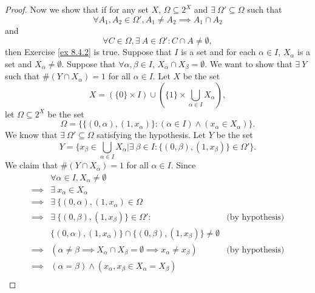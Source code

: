 \begin{proof}
    Now we show that if for any set \(X\), \(\Omega \subseteq 2^X\) and \(\exists\ \Omega' \subseteq \Omega\) such that
    \[
        \forall A_1, A_2 \in \Omega', A_1 \neq A_2 \implies A_1 \cap A_2
    \]
    and
    \[
        \forall C \in \Omega, \exists\ A \in \Omega' : C \cap A \neq \emptyset,
    \]
    then Exercise \ref{ex 8.4.2} is true.
    Suppose that \(I\) is a set and for each \(\alpha \in I\), \(X_{\alpha}\) is a set and \(X_{\alpha} \neq \emptyset\).
    Suppose that \(\forall \alpha, \beta \in I\), \(X_{\alpha} \cap X_{\beta} = \emptyset\).
    We want to show that \(\exists\ Y\) such that \(\#(Y \cap X_{\alpha}) = 1\) for all \(\alpha \in I\).
    Let \(X\) be the set
    \[
        X = (\{0\} \times I) \cup (\{1\} \times \bigcup_{\alpha \in I} X_{\alpha}),
    \]
    let \(\Omega \subseteq 2^X\) be the set
    \[
        \Omega = \big\{\{(0, \alpha), (1, x_{\alpha})\} : (\alpha \in I) \land (x_{\alpha} \in X_{\alpha})\big\}.
    \]
    We know that \(\exists\ \Omega' \subseteq \Omega\) satisfying the hypothesis.
    Let \(Y\) be the set
    \[
        Y = \big\{x_{\beta} \in \bigcup_{\alpha \in I} X_{\alpha} | \exists\ \beta \in I : \{(0, \beta), (1, x_{\beta})\} \in \Omega'\big\}.
    \]
    We claim that \(\#(Y \cap X_{\alpha}) = 1\) for all \(\alpha \in I\).
    Since
    \begin{align*}
                 & \forall \alpha \in I, X_{\alpha} \neq \emptyset                                                                                \\
        \implies & \exists\ x_{\alpha} \in X_{\alpha}                                                                                             \\
        \implies & \exists\ \{(0, \alpha), (1, x_{\alpha}) \in \Omega                                                                             \\
        \implies & \exists\ \{(0, \beta), (1, x_{\beta})\} \in \Omega' :                                                 & \text{(by hypothesis)} \\
                 & \{(0, \alpha), (1, x_{\alpha})\} \cap \{(0, \beta), (1, x_{\beta})\} \neq \emptyset                                            \\
        \implies & (\alpha \neq \beta \implies X_{\alpha} \cap X_{\beta} = \emptyset \implies x_{\alpha} \neq x_{\beta}) & \text{(by hypothesis)} \\
        \implies & (\alpha = \beta) \land (x_{\alpha}, x_{\beta} \in X_{\alpha} = X_{\beta})                                                      \\

\end{align*}
\end{proof}
